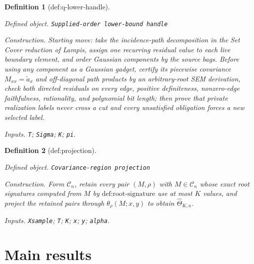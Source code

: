 \documentclass{article}
\newtheorem{definition}{Definition}
\begin{document}
\begin{definition}[def:q-lower-handle]\label{def:q-lower-handle}
\par\smallskip\noindent\emph{Defined object.} \texttt{Supplied-\allowbreak{}order lower-\allowbreak{}bound handle}
\par\smallskip\noindent\emph{Construction.} Starting move: take the incidence-path decomposition in the Set Cover reduction of Lampis, assign one recurring residual value to each live boundary element, and order Gaussian components by the source bags. Before using any component as a Gaussian gadget, certify its piecewise covariance \(M_{xx}=\widetilde a_x\) and off-diagonal path products by an arbitrary-root SEM derivation, check both directed residuals on every edge, positive definiteness, nonzero-edge faithfulness, rationality, and polynomial bit length; then prove that private realization labels never cross a cut and every unsatisfied obligation forces a new selected label.
\par\smallskip\noindent\emph{Inputs.} \texttt{T}; \texttt{Sigma}; \texttt{K}; \texttt{pi}.
\end{definition}

\begin{definition}[def:projection]\label{def:projection}
\par\smallskip\noindent\emph{Defined object.} \texttt{Covariance-\allowbreak{}region projection}
\par\smallskip\noindent\emph{Construction.} Form \(\mathcal C_n\), retain every pair \((M,\rho)\) with \(M\in\mathcal C_n\) whose exact root signatures computed from \(M\) by \(\text{def:root-signature}\) use at most \(K\) values, and project the retained pairs through \(\theta_\rho(M;x,y)\) to obtain \(\widehat\Theta_{K,n}\).
\par\smallskip\noindent\emph{Inputs.} \texttt{Xsample}; \texttt{T}; \texttt{K}; \texttt{x}; \texttt{y}; \texttt{alpha}.
\end{definition}

\section{Main results}
\end{document}
